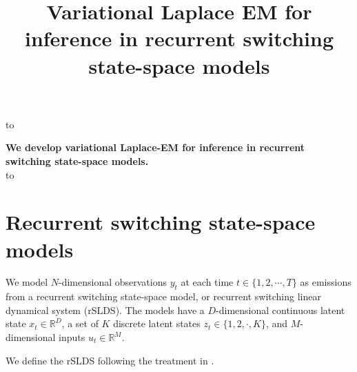 \documentclass[11pt]{article}
\begin{document}



\title{Variational Laplace EM for inference in recurrent switching state-space models} 


\maketitle


\hbox to \textwidth{\hrulefill} 
\vspace{-.1in}

{\bf We develop variational Laplace-EM for inference in recurrent switching state-space models.}\\
\hbox to \textwidth{\hrulefill}

\section{Recurrent switching state-space models}

We model $N$-dimensional observations $y_t$ at each time $t \in \{ 1, 2, \cdots, T\}$ as emissions from a recurrent switching state-space model, or recurrent switching linear dynamical system (rSLDS). The models have a $D$-dimensional continuous latent state $x_t \in \mathbb{R}^D$, a set of $K$ discrete latent states $z_t \in \{ 1, 2, \cdot, K \}$, and $M$-dimensional inputs $u_t \in \mathbb{R}^M$. 

We define the rSLDS following the treatment in \cite{linderman2017bayesian}.
\end{document}
